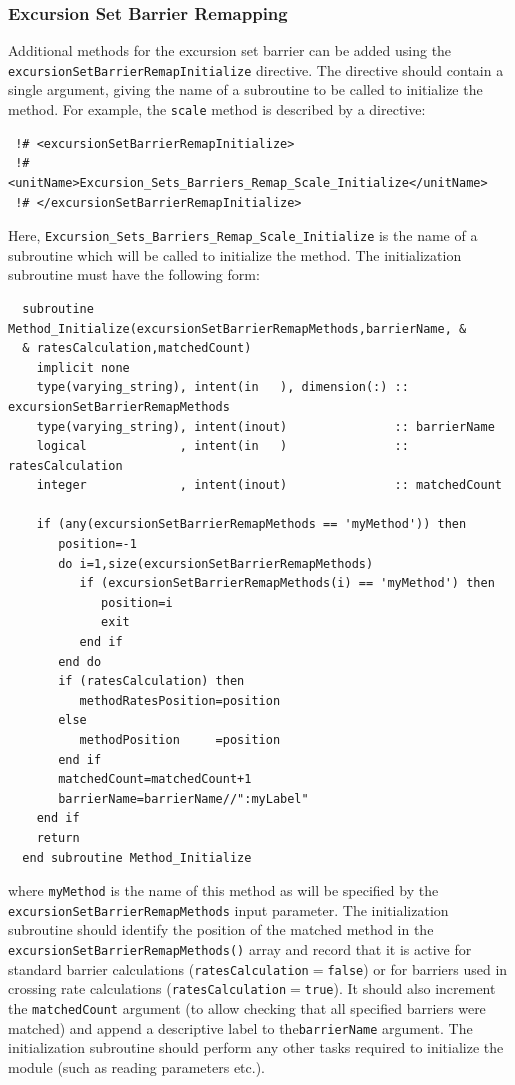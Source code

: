 \subsubsection{Excursion Set Barrier Remapping}\label{sec:excursionSetBarrierRemapInitialize}

Additional methods for the excursion set barrier can be added using the {\tt excursionSetBarrierRemapInitialize} directive. The directive should contain a single argument, giving the name of a subroutine to be called to initialize the method. For example, the {\tt scale} method is described by a directive:
\begin{verbatim}
 !# <excursionSetBarrierRemapInitialize>
 !#  <unitName>Excursion_Sets_Barriers_Remap_Scale_Initialize</unitName>
 !# </excursionSetBarrierRemapInitialize>
\end{verbatim}
Here, {\tt Excursion\_Sets\_Barriers\_Remap\_Scale\_Initialize} is the name of a subroutine which will be called to initialize the method. The initialization subroutine must have the following form:
\begin{verbatim}
  subroutine Method_Initialize(excursionSetBarrierRemapMethods,barrierName, &
  & ratesCalculation,matchedCount)
    implicit none
    type(varying_string), intent(in   ), dimension(:) :: excursionSetBarrierRemapMethods
    type(varying_string), intent(inout)               :: barrierName
    logical             , intent(in   )               :: ratesCalculation
    integer             , intent(inout)               :: matchedCount

    if (any(excursionSetBarrierRemapMethods == 'myMethod')) then
       position=-1
       do i=1,size(excursionSetBarrierRemapMethods)
          if (excursionSetBarrierRemapMethods(i) == 'myMethod') then
             position=i
             exit
          end if
       end do
       if (ratesCalculation) then
          methodRatesPosition=position
       else
          methodPosition     =position
       end if
       matchedCount=matchedCount+1
       barrierName=barrierName//":myLabel"
    end if
    return
  end subroutine Method_Initialize
\end{verbatim}
where {\tt myMethod} is the name of this method as will be specified by the {\tt excursionSetBarrierRemapMethods} input parameter. The initialization subroutine should identify the position of the matched method in the {\tt excursionSetBarrierRemapMethods()} array and record that it is active for standard barrier calculations ({\tt ratesCalculation}$=${\tt false}) or for barriers used in crossing rate calculations ({\tt ratesCalculation}$=${\tt true}). It should also increment the {\tt matchedCount} argument (to allow checking that all specified barriers were matched) and append a descriptive label to the{\tt barrierName} argument. The initialization subroutine should perform any other tasks required to initialize the module (such as reading parameters etc.).

